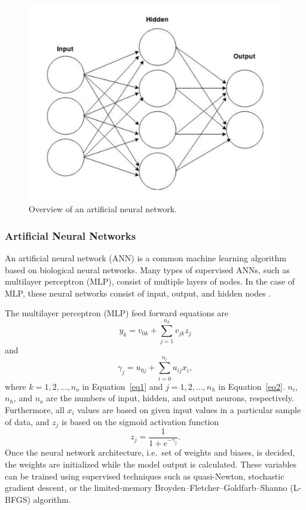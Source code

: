 \documentclass[12pt]{uthesis-v12}  %
\begin{document}

\begin{figure}[!t]
\centering
\includegraphics[width=6in]{ann1}
\caption{Overview of an artificial neural network.}
\label{challenges}
\end{figure}

\subsubsection{Artificial Neural Networks}

An artificial neural network (ANN) is a common machine learning algorithm based on biological neural networks. Many types of supervised ANNs, such as multilayer perceptron (MLP), consist of multiple layers of nodes. In the case of MLP, these neural networks consist of input, output, and hidden nodes \cite{malsburg}. 

The multilayer perceptron (MLP) feed forward equations are \cite{mavr}
\begin{equation}
y_k = v_{0k} + \sum\limits_{j=1}^{n_h} v_{jk} z_j
\label{eq1}
\end{equation}
and
\begin{equation}
\gamma_j = u_{0j} + \sum\limits_{i=0}^{n_i} u_{ij} x_i,
\label{eq2}
\end{equation}
where $k=1,2,\dots,n_o$ in Equation~\ref{eq1} and $j=1,2,\dots,n_h$ in Equation~\ref{eq2}. ${n_i}$, ${n_h}$, and ${n_o}$ are the numbers of input, hidden, and output neurons, respectively. Furthermore, all ${x_i}$ values are based on given input values in a particular sample of data, and ${z_j}$ is based on the sigmoid activation function
\begin{equation}
z_j = \frac{1}{1+e^{-\gamma_j}}.
\label{eq3}
\end{equation}
Once the neural network architecture, i.e.~set of weights and biases, is decided, the weights are initialized while the model output is calculated. These variables can be trained using supervised techniques such as quasi-Newton, stochastic gradient descent, or the limited-memory Broyden–Fletcher–Goldfarb–Shanno (L-BFGS) algorithm.
\end{document}
